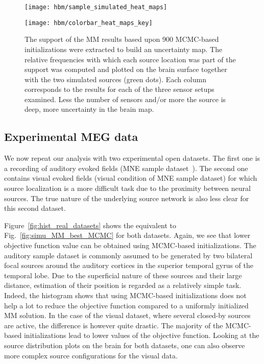\begin{figure}[htp]
	\centering
	\begin{minipage}{\linewidth}
		\begin{minipage}{0.9\linewidth}
			\setlength\tabcolsep{0.1pt} %
			\texttt{[image: hbm/sample\_simulated\_heat\_maps]}%
		\end{minipage}
		\begin{minipage}{0.09\linewidth}
				\texttt{[image: hbm/colorbar\_heat\_maps\_key]}%
		\end{minipage}
	\end{minipage}
	\caption{The support of the MM results based upon 900 MCMC-based initializations were extracted to build an uncertainty map. The relative frequencies with which each source location was part of the support was computed and plotted on the brain surface together with the two simulated sources (green dots). Each column corresponds to the results for each of the three sensor setups examined. Less the number of sensors and/or more the source is deep, more uncertainty in the brain map.}
	\label{fig:results_simu_heat_maps}
\end{figure}


\subsection{Experimental MEG data}
We now repeat our analysis with two experimental open datasets. The first one is a recording of auditory evoked fields (MNE sample dataset~\cite{mne-python}). The second one contains visual evoked fields (visual condition of MNE sample dataset) for which source localization is a more difficult task due to the proximity between neural sources. The true nature of the underlying source network is also less clear for this second dataset.

Figure~\ref{fig:hist_real_datasets} shows the equivalent to Fig.~\ref{fig:simu_MM_best_MCMC} for both datasets. Again, we see that lower objective function value can be obtained using MCMC-based initializations. The auditory sample dataset is commonly assumed to be generated by two bilateral focal sources around the auditory cortices in the superior temporal gyrus of the temporal lobe. Due to the superficial nature of these sources and their large distance, estimation of their position is regarded as a relatively simple task. Indeed, the histogram shows that using MCMC-based initializations does not help a lot to reduce the objective function compared to a uniformly initialized MM solution. In the case of the visual dataset, where several closed-by sources are active, the difference is however quite drastic. The majority of the MCMC-based initializations lead to lower values of the objective function. Looking at the source distribution plots on the brain for both datasets, one can also observe more complex source configurations for the visual data.

